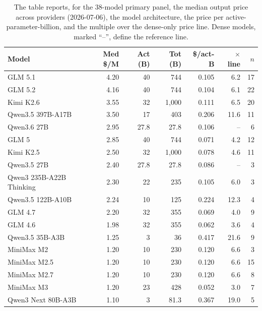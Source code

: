 \documentclass[11pt]{article}
\begin{document}
\begin{table}[t]
\centering
\caption{The table reports, for the 38-model primary panel, the median
output price across providers (2026-07-06), the model architecture, the
price per active-parameter-billion, and the multiple over the dense-only
price line. Dense models, marked ``--'', define the reference line.}
\label{tab:panel}
\small
\begin{tabular}{lrrrrrr}
\toprule
Model & Med \$/M & Act (B) & Tot (B) & \$/act-B & $\times$ line & $n$ \\
\midrule
GLM 5.1                    & 4.20  & 40   & 744     & 0.105 & 6.2  & 17 \\
GLM 5.2                    & 4.16  & 40   & 744     & 0.104 & 6.1  & 22 \\
Kimi K2.6                  & 3.55  & 32   & 1{,}000 & 0.111 & 6.5  & 20 \\
Qwen3.5 397B-A17B          & 3.50  & 17   & 403     & 0.206 & 11.6 & 11 \\
Qwen3.6 27B                & 2.95  & 27.8 & 27.8    & 0.106 & --   & 6  \\
GLM 5                      & 2.85  & 40   & 744     & 0.071 & 4.2  & 12 \\
Kimi K2.5                  & 2.50  & 32   & 1{,}000 & 0.078 & 4.6  & 11 \\
Qwen3.5 27B                & 2.40  & 27.8 & 27.8    & 0.086 & --   & 3  \\
Qwen3 235B-A22B Thinking   & 2.30  & 22   & 235     & 0.105 & 6.0  & 3  \\
Qwen3.5 122B-A10B          & 2.24  & 10   & 125     & 0.224 & 12.3 & 4  \\
GLM 4.7                    & 2.20  & 32   & 355     & 0.069 & 4.0  & 9  \\
GLM 4.6                    & 1.98  & 32   & 355     & 0.062 & 3.6  & 4  \\
Qwen3.5 35B-A3B            & 1.25  & 3    & 36      & 0.417 & 21.6 & 9  \\
MiniMax M2                 & 1.20  & 10   & 230     & 0.120 & 6.6  & 3  \\
MiniMax M2.5               & 1.20  & 10   & 230     & 0.120 & 6.6  & 15 \\
MiniMax M2.7               & 1.20  & 10   & 230     & 0.120 & 6.6  & 8  \\
MiniMax M3                 & 1.20  & 23   & 428     & 0.052 & 3.0  & 7  \\
Qwen3 Next 80B-A3B         & 1.10  & 3    & 81.3    & 0.367 & 19.0 & 5  \\

\end{tabular}
\end{table}
\end{document}
